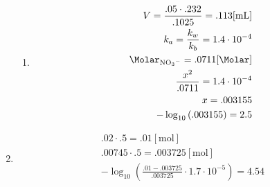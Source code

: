 \documentclass[12pt]{article}
\begin{document}
\begin{enumerate}
\begin{enumerate}
      \item

        \begin{equation}
          \begin{split}
            V=\frac{.05\cdot.232}{.1025}=.113[\si{\milli\liter}]\\
            k_a=\frac{k_w}{k_b}=1.4\cdot10^{-4}\\
            \si{\Molar}_{\ce{NO3-}}=.0711[\si{\Molar}]\\
            \frac{x^2}{.0711}=1.4\cdot10^{-4}\\
            x=.003155\\
            -\log_{10}\left( .003155 \right)=2.5
          \end{split}
          \label{4}
        \end{equation}

    \end{enumerate}

  \item

        \begin{equation}
          \begin{split}
            .02\cdot.5=.01[\si{\mole}]\\
            .00745\cdot.5=.003725[\si{\mole}]\\
            -\log_{10}\left( \frac{.01-.003725}{.003725}\cdot1.7\cdot10^{-5} \right)=4.54\\
          \end{split}
          \label{5}
        \end{equation}

\end{enumerate}
\end{document}
